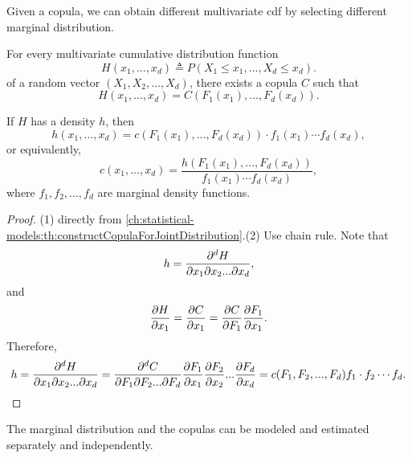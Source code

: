 \begin{refsection}
\begin{remark}
Given a copula, we can obtain different multivariate cdf by selecting different marginal distribution.
\end{remark}



\begin{theorem}\label{ch:statistical-models:SklarTheorem}
For every multivariate cumulative distribution function
$$H(x_1,...,x_d) \triangleq P(X_1\leq x_1,...,X_d \leq x_d).$$
of a random vector $(X_1,X_2,...,X_d)$, there exists a copula $C$ such that
$$H(x_1,...,x_d) = C(F_1(x_1),...,F_d(x_d)).$$

If $H$ has a density $h$, then
$$h(x_1,...,x_d) = c(F_1(x_1),...,F_d(x_d))\cdot f_1(x_1)\cdots f_d(x_d),$$
or equivalently, 
$$c(x_1,...,x_d) = \frac{h(F_1(x_1),...,F_d(x_d))}{f_1(x_1)\cdots f_d(x_d)},$$
where $f_1,f_2,...,f_d$ are marginal density functions.
\end{theorem}
\begin{proof}
(1) directly from \autoref{ch:statistical-models:th:constructCopulaForJointDistribution}.(2) Use chain rule. Note that
$$h = \frac{\partial^d H}{\partial x_1\partial x_2 ... \partial x_d},$$
and $$\frac{\partial H}{\partial x_1} =\frac{\partial C}{\partial x_1} = \frac{\partial C}{\partial F_1}\frac{\partial F_1}{\partial x_1}.$$
Therefore, 
$$h = \frac{\partial^d H}{\partial x_1\partial x_2 ... \partial x_d} = \frac{\partial^d C}{\partial F_1\partial F_2 ... \partial F_d}\frac{\partial F_1}{\partial x_1}\frac{\partial F_2}{\partial x_2}...\frac{\partial F_d}{\partial x_d} = c(F_1,F_2,...,F_d)f_1\cdot f_2\cdots f_d.$$
\end{proof}

\begin{remark}
	The marginal distribution and the copulas can be modeled and estimated separately and independently. 
\end{remark}



\end{refsection}
